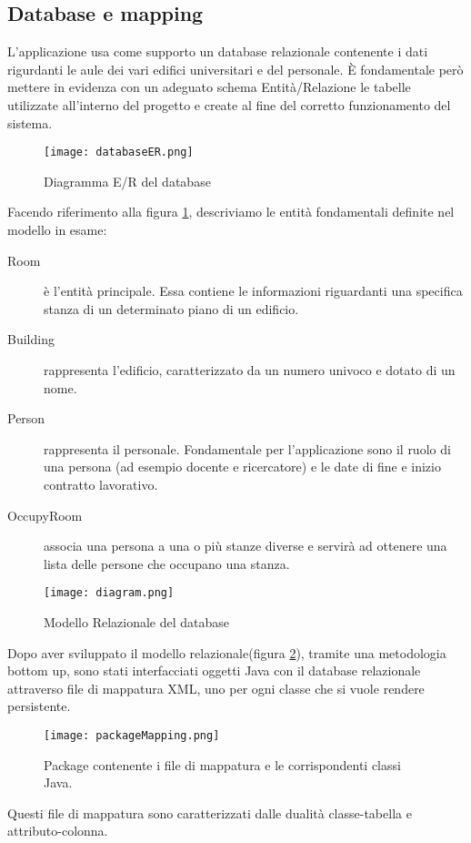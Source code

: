 \FloatBarrier
\subsection{Database e mapping}

L'applicazione usa come supporto un database relazionale contenente i dati rigurdanti le aule dei vari edifici universitari e del personale.
\`E fondamentale però mettere in evidenza con un adeguato schema Entità/Relazione le tabelle utilizzate all’interno del progetto e create al fine del corretto funzionamento del 
sistema.

\begin{figure}[!htb]
\centering
\texttt{[image: databaseER.png]}
\caption{Diagramma E/R del database}\label{fig:database}
\end{figure}

Facendo riferimento alla figura \ref{fig:database}, descriviamo le entità fondamentali definite nel modello in esame:
\FloatBarrier
\begin{description}
\item[Room]\`e l'entit\`a principale. Essa contiene le informazioni riguardanti una specifica stanza di un determinato piano di un edificio. 
\item[Building]rappresenta l'edificio, caratterizzato da un numero univoco e dotato di un nome.
\item[Person]rappresenta il personale. Fondamentale per l'applicazione sono il ruolo di una persona (ad esempio docente e ricercatore) e le date di fine e inizio contratto lavorativo.
\item[OccupyRoom]associa una persona a una o pi\`u stanze diverse e  servir\`a ad ottenere una lista delle persone che occupano una stanza.
\end{description}

\FloatBarrier
\begin{figure}[!htb]
\centering
\texttt{[image: diagram.png]}
\caption{Modello Relazionale del database}\label{fig:databaseRelaz}
\end{figure}
\FloatBarrier
Dopo aver sviluppato il modello relazionale(figura \ref{fig:databaseRelaz}), tramite una metodologia bottom up, sono stati interfacciati oggetti Java con il database relazionale attraverso file di mappatura XML, uno per ogni classe che si vuole rendere persistente.\\ 

\begin{figure}[!htb]
\centering
\texttt{[image: packageMapping.png]}
\caption{Package contenente i file di mappatura e le corrispondenti classi Java.}\label{fig:mappingPack}
\end{figure}
\FloatBarrier
Questi file di mappatura sono caratterizzati  dalle dualità classe-tabella e attributo-colonna.
